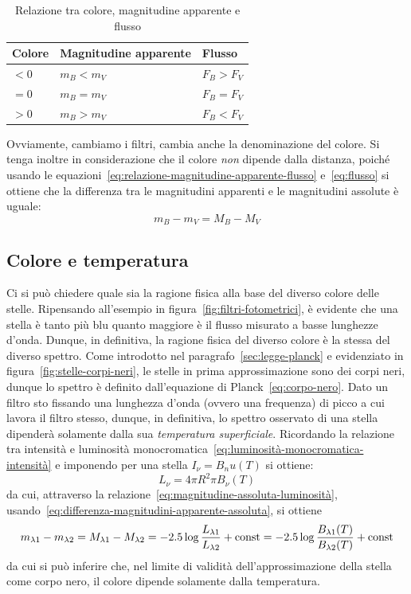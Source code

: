 \begin{table}
\caption{Relazione tra colore, magnitudine apparente e flusso}
\label{tab:colore}
\centering
\begin{tabular}{lll}
\toprule
Colore & Magnitudine apparente & Flusso \\
\midrule
$<0$ & $m_B < m_V$ & $F_B > F_V$ \\
$=0$ & $m_B = m_V$ & $F_B = F_V$ \\
$>0$ & $m_B > m_V$ & $F_B < F_V$ \\
\bottomrule
\end{tabular}
\end{table}

Ovviamente, cambiamo i filtri, cambia anche la denominazione del colore. Si tenga inoltre in considerazione che il colore \emph{non} dipende dalla distanza, poiché usando le equazioni~\eqref{eq:relazione-magnitudine-apparente-flusso} e~\eqref{eq:flusso} si ottiene che la differenza tra le magnitudini apparenti e le magnitudini assolute è uguale:
\begin{equation}\label{eq:differenza-magnitudini-apparente-assoluta}
    m_B-m_V = M_B-M_V
\end{equation}

\subsection{Colore e temperatura}
Ci si può chiedere quale sia la ragione fisica alla base del diverso colore delle stelle. Ripensando all'esempio in figura~\ref{fig:filtri-fotometrici}, è evidente che una stella è tanto più blu quanto maggiore è il flusso misurato a basse lunghezze d'onda. Dunque, in definitiva, la ragione fisica del diverso colore è la stessa del diverso spettro. Come introdotto nel paragrafo~\ref{sec:legge-planck} e evidenziato in figura~\ref{fig:stelle-corpi-neri}, le stelle in prima approssimazione sono dei corpi neri, dunque lo spettro è definito dall'equazione di Planck~\eqref{eq:corpo-nero}. Dato un filtro sto fissando una lunghezza d'onda (ovvero una frequenza) di picco a cui lavora il filtro stesso, dunque, in definitiva, lo spettro osservato di una stella dipenderà solamente dalla sua \emph{temperatura superficiale}. Ricordando la relazione tra intensità e luminosità monocromatica~\eqref{eq:luminosità-monocromatica-intensità} e imponendo per una stella $I_\nu = B_nu (T)$ si ottiene:
\[
    L_\nu = 4 \pi R^2 \pi B_\nu (T)
\]
da cui, attraverso la relazione~\eqref{eq:magnitudine-assoluta-luminosità}, usando~\eqref{eq:differenza-magnitudini-apparente-assoluta}, si ottiene
\[
    m_{\lambda 1} - m_{\lambda 2} = M_{\lambda 1} - M_{\lambda 2} = -2.5 \log\frac{L_{\lambda 1}}{L_{\lambda 2}} + \textup{const} = -2.5 \log\frac{B_{\lambda 1}(T)}{B_{\lambda 2}(T)} + \textup{const}
\]
da cui si può inferire che, nel limite di validità dell'approssimazione della stella come corpo nero, il colore dipende solamente dalla temperatura.

